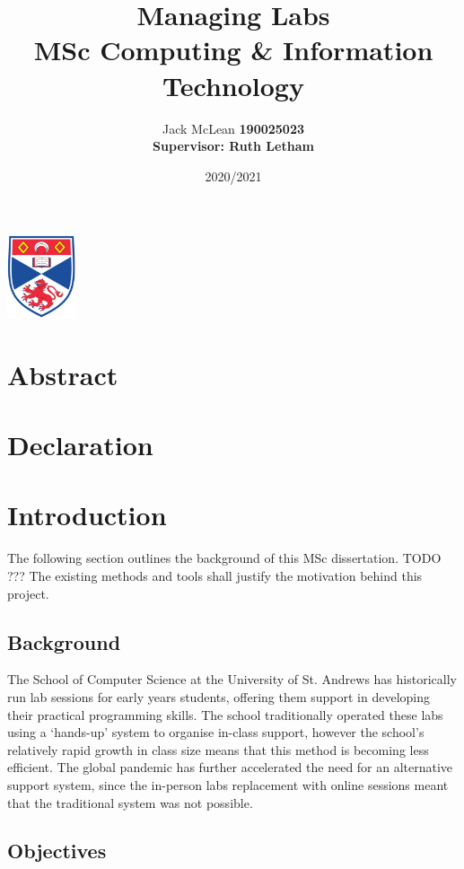\documentclass[a4paper,11pt]{article}
\title{\textbf{Managing Labs} \\ \large MSc Computing \& Information Technology}
\author{Jack McLean \bf190025023 \\ Supervisor: Ruth Letham}
\date{2020/2021}
\begin{document}
\maketitle
\begin{center}
\includegraphics[width = 2cm]{crest.png}
\end{center}

\newpage
\section*{Abstract}

\section*{Declaration}

\newpage
\tableofcontents

\newpage
\section{Introduction}

The following section outlines the background of this MSc dissertation. TODO ??? The existing methods and tools shall justify the motivation behind this project. 

\subsection{Background}

The School of Computer Science at the University of St. Andrews has historically run lab sessions for early years students, offering them support in developing their practical programming skills. The school traditionally operated these labs using a ‘hands-up’ system to organise in-class support, however the school's relatively rapid growth in class size means that this method is becoming less efficient. The global pandemic has further accelerated the need for an alternative support system, since the in-person labs replacement with online sessions meant that the traditional system was not possible. 


\subsection{Objectives}
\end{document}
